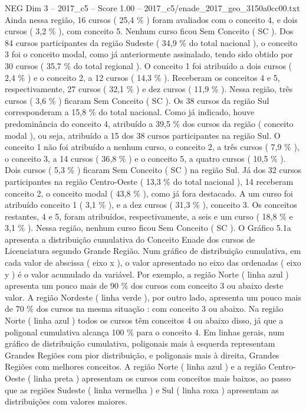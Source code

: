 \begin{textsample}{NEG Dim 3 – 2017\_c5 – Score 1.00 – 2017\_c5/enade\_2017\_geo\_3150a0cc00.txt}
Ainda nessa região, 16 cursos ( 25,4 \% ) foram avaliados com o conceito 4, e dois cursos ( 3,2 \% ), com conceito 5.
Nenhum curso ficou Sem Conceito ( SC ).
Dos 84 cursos participantes da região Sudeste ( 34,9 \% do total nacional ), o conceito 3 foi o conceito modal, como já anteriormente assinalado, tendo sido obtido por 30 cursos ( 35,7 \% do total regional ).
O conceito 1 foi atribuído a dois cursos ( 2,4 \% ) e o conceito 2, a 12 cursos ( 14,3 \% ).
Receberam os conceitos 4 e 5, respectivamente, 27 cursos ( 32,1 \% ) e dez cursos ( 11,9 \% ).
Nessa região, três cursos ( 3,6 \% ) ficaram Sem Conceito ( SC ).
Os 38 cursos da região Sul corresponderam a 15,8 \% do total nacional.
Como já indicado, houve predominância do conceito 4, atribuído a 39,5 \% dos cursos da região ( conceito modal ), ou seja, atribuído a 15 dos 38 cursos participantes na região Sul.
O conceito 1 não foi atribuído a nenhum curso, o conceito 2, a três cursos ( 7,9 \% ), o conceito 3, a 14 cursos ( 36,8 \% ) e o conceito 5, a quatro cursos ( 10,5 \% ).
Dois cursos ( 5,3 \% ) ficaram Sem Conceito ( SC ) na região Sul.
Já dos 32 cursos participantes na região Centro-Oeste ( 13,3 \% do total nacional ), 14 receberam conceito 2, o conceito modal ( 43,8 \% ), como já fora destacado.
A um curso foi atribuído conceito 1 ( 3,1 \% ), e a dez cursos ( 31,3 \% ), conceito 3.
Os conceitos restantes, 4 e 5, foram atribuídos, respectivamente, a seis e um curso ( 18,8 \% e 3,1 \% ).
Nessa região, nenhum curso ficou Sem Conceito ( SC ).
O Gráfico 5.1a apresenta a distribuição cumulativa do Conceito Enade dos cursos de Licenciatura segundo Grande Região.
Num gráfico de distribuição cumulativa, em cada valor de abscissa ( eixo x ), o valor apresentado no eixo das ordenadas ( eixo y ) é o valor acumulado da variável.
Por exemplo, a região Norte ( linha azul ) apresenta um pouco mais de 90 \% dos cursos com conceito 3 ou abaixo deste valor.
A região Nordeste ( linha verde ), por outro lado, apresenta um pouco mais de 70 \% dos cursos na mesma situação : com conceito 3 ou abaixo.
Na região Norte ( linha azul ) todos os cursos têm conceitos 4 ou abaixo disso, já que a poligonal cumulativa alcança 100 \% para o conceito 4.
Em linhas gerais, num gráfico de distribuição cumulativa, poligonais mais à esquerda representam Grandes Regiões com pior distribuição, e poligonais mais à direita, Grandes Regiões com melhores conceitos.
A região Norte ( linha azul ) e a região Centro-Oeste ( linha preta ) apresentam os cursos com conceitos mais baixos, ao passo que as regiões Sudeste ( linha vermelha ) e Sul ( linha roxa ) apresentam as distribuições com valores maiores.

\end{textsample}
